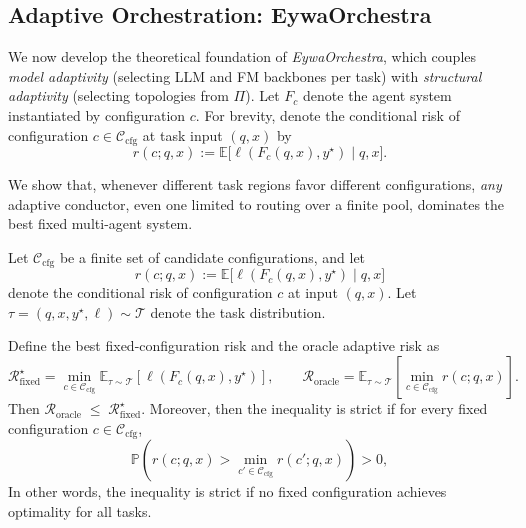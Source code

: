 \subsection{Adaptive Orchestration: EywaOrchestra}
\label{app:orchestra}

We now develop the theoretical foundation of \textit{EywaOrchestra}, which couples \emph{model adaptivity} (selecting LLM and FM backbones per task) with \emph{structural adaptivity} (selecting topologies from $\Pi$). Let $F_c$ denote the agent system instantiated by configuration $c$. For brevity, denote the conditional risk of configuration $c\in\mathcal{C}_{\mathrm{cfg}}$ at task input $(q,x)$ by
\begin{equation}
r(c;q,x):=\mathbb{E}\big[\ell(F_c(q,x),y^\star)\mid q,x\big].
\end{equation}


We show that,  whenever different task regions favor different configurations, \emph{any} adaptive conductor, even one limited to routing over a finite pool, dominates the best fixed multi-agent system.

\begin{theorem}
\label{thm:orchestra_oracle}
Let $\mathcal{C}_{\mathrm{cfg}}$ be a finite set of candidate configurations, and let
\[
r(c;q,x):=\mathbb{E}\big[\ell(F_c(q,x),y^\star)\mid q,x\big]
\]
denote the conditional risk of configuration $c$ at input $(q,x)$. Let $\tau=(q,x,y^\star,\ell)\sim\mathcal{T}$ denote the task distribution.

Define the best fixed-configuration risk and the oracle adaptive risk as
\begin{equation}
\mathcal{R}_{\mathrm{fixed}}^\star
=
\min_{c\in\mathcal{C}_{\mathrm{cfg}}}
\mathbb{E}_{\tau\sim\mathcal{T}}[\ell(F_c(q,x),y^\star)],
\qquad
\mathcal{R}_{\mathrm{oracle}}
=
\mathbb{E}_{\tau\sim\mathcal{T}}\!\left[\min_{c\in\mathcal{C}_{\mathrm{cfg}}}r(c;q,x)\right].
\end{equation}
Then $\mathcal{R}_{\mathrm{oracle}}\;\le\;\mathcal{R}_{\mathrm{fixed}}^\star$.
Moreover, then the inequality is strict if for every fixed configuration $c\in\mathcal{C}_{\mathrm{cfg}}$,
\begin{equation}
\mathbb{P}\!\left(
r(c;q,x) >
\min_{c'\in\mathcal{C}_{\mathrm{cfg}}} r(c';q,x)
\right)>0,
\end{equation}
In other words, the inequality is strict if no fixed configuration achieves optimality for all tasks.
\end{theorem}


